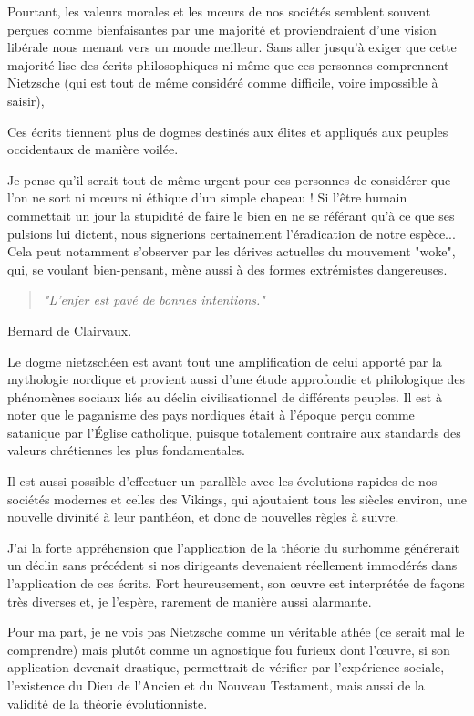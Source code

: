 Pourtant, les valeurs morales et les mœurs de nos sociétés semblent souvent perçues comme bienfaisantes par une majorité et proviendraient d’une vision libérale nous menant vers un monde meilleur. Sans aller jusqu’à exiger que cette majorité lise des écrits philosophiques ni même que ces personnes comprennent Nietzsche (qui est tout de même considéré comme difficile, voire impossible à saisir),

Ces écrits tiennent plus de dogmes destinés aux élites et appliqués aux peuples occidentaux de manière voilée.

Je pense qu'il serait tout de même urgent pour ces personnes de considérer que l’on ne sort ni mœurs ni éthique d’un simple chapeau ! Si l’être humain commettait un jour la stupidité de faire le bien en ne se référant qu’à ce que ses pulsions lui dictent, nous signerions certainement l’éradication de notre espèce... Cela peut notamment s'observer par les dérives actuelles du mouvement "woke", qui, se voulant bien-pensant, mène aussi à des formes extrémistes dangereuses.

\begin{center}
\begin{quote}
\textit{"L'enfer est pavé de bonnes intentions."}\end{quote} Bernard de Clairvaux.
\end{center}

Le dogme nietzschéen est avant tout une amplification de celui apporté par la mythologie nordique et provient aussi d'une étude approfondie et philologique des phénomènes sociaux liés au déclin civilisationnel de différents peuples. Il est à noter que le paganisme des pays nordiques était à l’époque perçu comme satanique par l’Église catholique, puisque totalement contraire aux standards des valeurs chrétiennes les plus fondamentales.

Il est aussi possible d'effectuer un parallèle avec les évolutions rapides de nos sociétés modernes et celles des Vikings, qui ajoutaient tous les siècles environ, une nouvelle divinité à leur panthéon, et donc de nouvelles règles à suivre.

J’ai la forte appréhension que l’application de la théorie du surhomme générerait un déclin sans précédent si nos dirigeants devenaient réellement immodérés dans l’application de ces écrits. Fort heureusement, son œuvre est interprétée de façons très diverses et, je l'espère, rarement de manière aussi alarmante.

Pour ma part, je ne vois pas Nietzsche comme un véritable athée (ce serait mal le comprendre) mais plutôt comme un agnostique fou furieux dont l’œuvre, si son application devenait drastique, permettrait de vérifier par l'expérience sociale, l’existence du Dieu de l’Ancien et du Nouveau Testament, mais aussi de la validité de la théorie évolutionniste.


